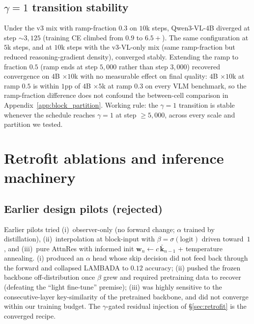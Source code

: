 \documentclass{article}
\begin{document}
\subsection{\texorpdfstring{$\gamma{=}1$ transition stability}{gamma=1 transition stability}}
\label{app:gamma_stability}
Under the v3 mix with ramp-fraction $0.3$ on $10$k steps, Qwen3-VL-4B diverged at step $\sim\!3{,}125$ (training CE climbed from $0.9$ to $6.5+$). The same configuration at $5$k steps, and at $10$k steps with the v3-VL-only mix (same ramp-fraction but reduced reasoning-gradient density), converged stably. Extending the ramp to fraction $0.5$ (ramp ends at step $5{,}000$ rather than step $3{,}000$) recovered convergence on $4$B $\times 10$k with no measurable effect on final quality: $4$B $\times 10$k at ramp $0.5$ is within $1$pp of $4$B $\times 5$k at ramp $0.3$ on every VLM benchmark, so the ramp-fraction difference does not confound the between-cell comparison in Appendix~\ref{app:block_partition}. Working rule: the $\gamma{=}1$ transition is stable whenever the schedule reaches $\gamma{=}1$ at step $\geq 5{,}000$, across every scale and partition we tested.

\section{Retrofit ablations and inference machinery}
\label{app:ablations}

\subsection{Earlier design pilots (rejected)}
\label{app:route_ablations}
Earlier pilots tried (i)~observer-only (no forward change; $\alpha$ trained by distillation), (ii)~interpolation at block-input with $\beta{=}\sigma(\text{logit})$ driven toward~$1$, and (iii)~pure AttnRes with informed init $\mathbf{w}_n \gets c\,\bar{\mathbf{k}}_{n-1}$ + temperature annealing. (i) produced an $\alpha$ head whose skip decision did not feed back through the forward and collapsed LAMBADA to $0.12$ accuracy; (ii) pushed the frozen backbone off-distribution once $\beta$ grew and required pretraining data to recover (defeating the ``light fine-tune'' premise); (iii) was highly sensitive to the consecutive-layer key-similarity of the pretrained backbone, and did not converge within our training budget. The $\gamma$-gated residual injection of \S\ref{sec:retrofit} is the converged recipe.
\end{document}

